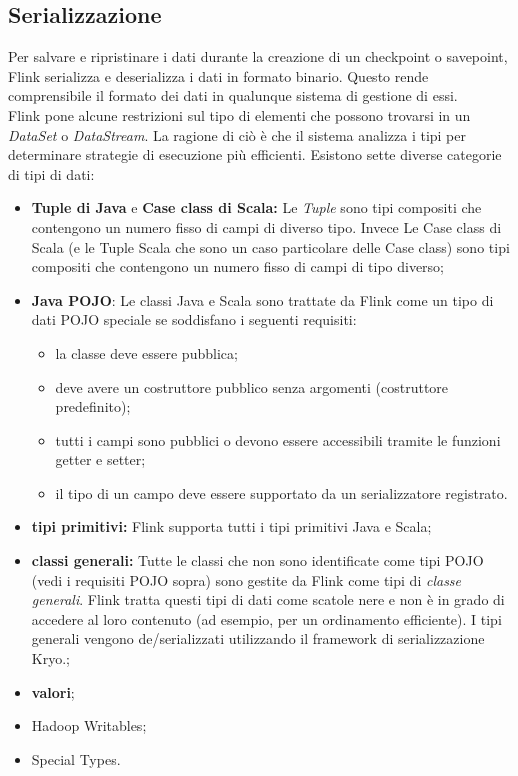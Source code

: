{\subsection{Serializzazione}
Per salvare e ripristinare i dati durante la creazione di un checkpoint o savepoint, Flink serializza e deserializza i dati in formato binario. Questo rende comprensibile il formato dei dati in qualunque sistema di gestione di essi.\\
Flink pone alcune restrizioni sul tipo di elementi che possono trovarsi in un \textit{DataSet} o \textit{DataStream}. La ragione di ciò è che il sistema analizza i tipi per determinare strategie di esecuzione più efficienti. Esistono sette diverse categorie di tipi di dati:
\begin{itemize}
	\item{\textbf{Tuple di Java} e \textbf{Case class di Scala:} Le \textit{Tuple} sono tipi compositi che contengono un numero fisso di campi di diverso tipo. Invece Le Case class di Scala (e le Tuple Scala che sono un caso particolare delle Case class) sono tipi compositi che contengono un numero fisso di campi di tipo diverso;}
	\item{\textbf{Java \gls{POJO}}: Le classi Java e Scala sono trattate da Flink come un tipo di dati POJO speciale se soddisfano i seguenti requisiti:
\begin{itemize}
	\item{la classe deve essere pubblica;}
	\item{deve avere un costruttore pubblico senza argomenti (costruttore predefinito);}
	\item{tutti i campi sono pubblici o devono essere accessibili tramite le funzioni getter e setter;}
	\item{il tipo di un campo deve essere supportato da un serializzatore registrato.}
\end{itemize}}
	\item{\textbf{tipi primitivi:} Flink supporta tutti i tipi primitivi Java e Scala;}
	\item{\textbf{classi generali:} Tutte le classi che non sono identificate come tipi POJO (vedi i requisiti \gls{POJO} sopra) sono gestite da Flink come tipi di \textit{classe generali}. Flink tratta questi tipi di dati come scatole nere e non è in grado di accedere al loro contenuto (ad esempio, per un ordinamento efficiente). I tipi generali vengono de/serializzati utilizzando il framework di serializzazione Kryo.;}
	\item{\textbf{valori};}
	\item{Hadoop Writables;}
	\item{Special Types.}
\end{itemize}

}
